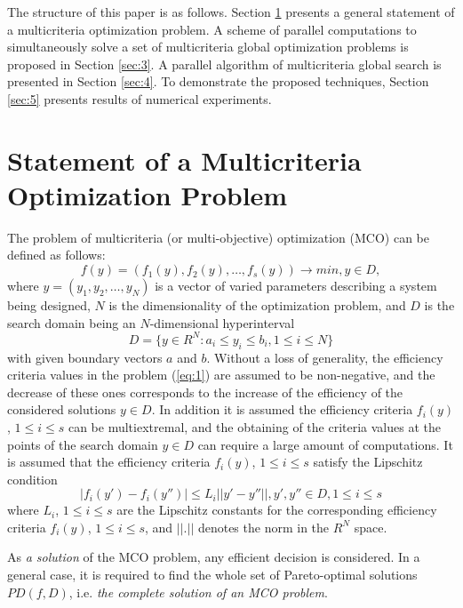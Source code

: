 The structure of this paper is as follows. Section \ref{sec:2} presents a general statement of a multicriteria optimization problem. A scheme of parallel computations to simultaneously solve a set of multicriteria global optimization problems is proposed in Section \ref{sec:3}. A parallel algorithm of multicriteria global search is presented in Section \ref{sec:4}. To demonstrate the proposed techniques, Section \ref{sec:5} presents results of numerical experiments.

\section{Statement of a Multicriteria Optimization Problem}
\label{sec:2}
The problem of multicriteria (or multi-objective) optimization (MCO) can be defined as follows:
\begin{equation}
f(y) =(f_1 (y),f_2 (y),\dots,f_s (y) )\to min,y\in D,	
\label{eq:1}
\end{equation}
where $y = (y_1,y_2,\dots,y_N)$ is a vector of varied parameters describing a system being designed, $N$ is the dimensionality of the optimization problem, and $D$ is the search domain being an $N$-dimensional hyperinterval
\begin{equation*}
D= \{ y \in R^N: a_i \leq y_i \leq b_i,1 \leq i \leq N \}
\end{equation*}
with given boundary vectors $a$ and $b$. Without a loss of generality, the efficiency criteria values in the problem (\ref{eq:1}) are assumed to be non-negative, and the decrease of these ones corresponds to the increase of the efficiency of the considered solutions $y \in D$. In addition it is assumed the efficiency criteria $f_i(y)$, $1 \leq i \leq s$ can be multiextremal, and the obtaining of the criteria values at the points of the search domain $y \in D$ can require a large amount of computations. It is assumed that the efficiency criteria $f_i(y)$, $1 \leq i \leq s$ satisfy the Lipschitz condition
\begin{equation}
|f_i (y') - f_i (y'') | \leq L_i ||y' - y''||, y', y'' \in D, 1\leq i\leq s	
\label{eq:2}
\end{equation}
where $L_i$, $1 \leq i \leq s$ are the Lipschitz constants for the corresponding efficiency criteria $f_i(y)$, $1 \leq i \leq s$, and $||.||$  denotes the norm in the $R^N$ space. 

As \textit{a solution} of the MCO problem, any efficient decision  is considered. In a general case, it is required to find the whole set of Pareto-optimal solutions $PD(f,D)$, i.e. \textit{the complete solution of an MCO problem}.

